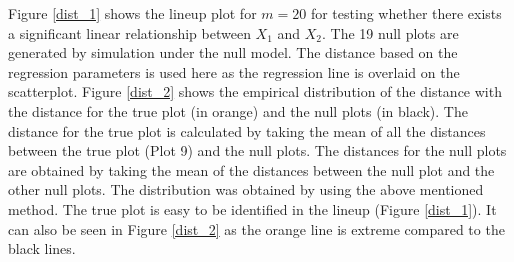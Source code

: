 \documentclass[12]{article}
\begin{document}
Figure \ref{dist_1} shows the lineup plot for $m = 20$ for testing whether there exists a significant linear relationship between $X_1$ and $X_2$. The 19 null plots are generated by simulation under the null model. The distance based on the regression parameters is used here as the regression line is overlaid on the scatterplot. Figure \ref{dist_2} shows the empirical distribution of the distance with the distance for the true plot (in orange) and the null plots (in black). The distance for the true plot is calculated by taking the mean of all the distances between the true plot (Plot 9) and the null plots. The distances for the null plots are obtained by taking the mean of the distances between the null plot and the other null plots. The distribution was obtained by using the above mentioned method. The true plot is easy to be identified in the lineup (Figure \ref{dist_1}). It can also be seen in Figure \ref{dist_2} as the orange line is extreme compared to the black lines. 
\end{document}
